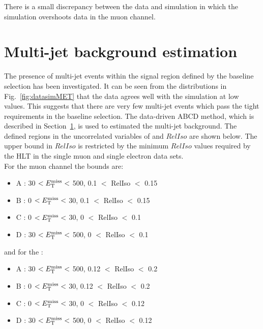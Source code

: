 There is a small discrepancy between the data and simulation in which the simulation overshoots data in the muon channel.

\section{Multi-jet background estimation}
\label{sec:QCDbackground}
The presence of multi-jet events within the signal region defined by the baseline selection has been investigated. 
It can be seen from the \MET distributions in Fig.~\ref{fig:datasimMET} that the data agrees well with the simulation at low values. This suggests that there are very few multi-jet events which pass the tight requirements in the baseline selection. 
The data-driven ABCD method, which is described in Section~\ref{sec:QCDbackground}, is used to estimated the multi-jet background. The defined regions in the uncorrelated variables of \MET and $RelIso$ are shown below. The upper bound in $RelIso$ is restricted by the minimum $RelIso$ values required by the HLT in the single muon and single electron data sets.\\

For the muon channel the bounds are:
\begin{itemize}
\setlength\itemsep{0em}
\item A : 30 $<E_{\mathrm{T}}^{\text{miss}}<$ 500, 0.1 $<$ RelIso $<$ 0.15
\item B : 0 $<E_{\mathrm{T}}^{\text{miss}}<$ 30, 0.1 $<$ RelIso $<$ 0.15
\item C : 0 $<E_{\mathrm{T}}^{\text{miss}}<$ 30, 0 $<$ RelIso $<$ 0.1
\item D : 30 $<E_{\mathrm{T}}^{\text{miss}}<$ 500, 0 $<$ RelIso $<$ 0.1
\end{itemize}
and for the \eplusjets:
\begin{itemize}
\itemsep0em
\item A : 30 $<E_{\mathrm{T}}^{\text{miss}}<$ 500, 0.12 $<$ RelIso $<$ 0.2
\item B : 0 $<E_{\mathrm{T}}^{\text{miss}}<$ 30, 0.12 $<$ RelIso $<$ 0.2
\item C : 0 $<E_{\mathrm{T}}^{\text{miss}}<$ 30, 0 $<$ RelIso $<$ 0.12
\item D : 30 $<E_{\mathrm{T}}^{\text{miss}}<$ 500, 0 $<$ RelIso $<$ 0.12
\end{itemize}

